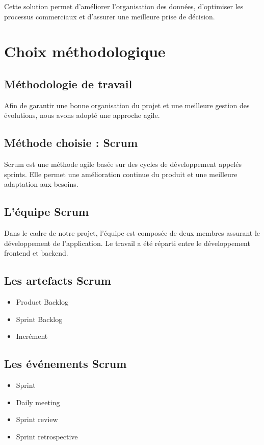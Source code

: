 \documentclass[12pt,a4paper,twoside,openany]{book}
\begin{document}
Cette solution permet d’améliorer l’organisation des données, d’optimiser les processus commerciaux et d’assurer une meilleure prise de décision.

\section{Choix méthodologique}

\subsection{Méthodologie de travail}

Afin de garantir une bonne organisation du projet et une meilleure gestion des évolutions, nous avons adopté une approche agile.

\subsection{Méthode choisie : Scrum}

Scrum est une méthode agile basée sur des cycles de développement appelés sprints. Elle permet une amélioration continue du produit et une meilleure adaptation aux besoins.

\subsection{L’équipe Scrum}

Dans le cadre de notre projet, l’équipe est composée de deux membres assurant le développement de l’application. Le travail a été réparti entre le développement frontend et backend.

\subsection{Les artefacts Scrum}

\begin{itemize}
\item Product Backlog
\item Sprint Backlog
\item Incrément
\end{itemize}

\subsection{Les événements Scrum}

\begin{itemize}
\item Sprint
\item Daily meeting
\item Sprint review
\item Sprint retrospective
\end{itemize}
\end{document}
